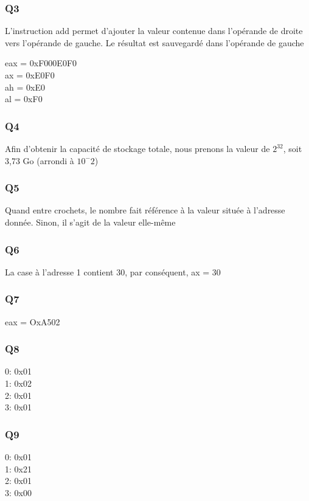 \documentclass[12pt,a4paper,oneside]{article}
\begin{document}
\subsubsection{Q3}
L'instruction add permet d'ajouter la valeur contenue dans l'opérande de droite vers l'opérande de gauche. Le résultat est sauvegardé dans l'opérande de gauche

eax = 0xF000E0F0\\
ax = 0xE0F0\\
ah = 0xE0\\
al = 0xF0\\

\subsubsection{Q4}
Afin d'obtenir la capacité de stockage totale, nous prenons la valeur de $2^{32}$, soit 3,73 Go (arrondi à $10^-2$)

\subsubsection{Q5}
Quand entre crochets, le nombre fait référence à la valeur située à l'adresse donnée. Sinon, il s'agit de la valeur elle-même

\subsubsection{Q6}
La case à l'adresse 1 contient 30, par conséquent, ax = 30

\subsubsection{Q7}
eax = OxA502

\subsubsection{Q8}
0: 0x01\\
1: 0x02\\
2: 0x01\\
3: 0x01\\

\subsubsection{Q9}
0: 0x01\\
1: 0x21\\
2: 0x01\\
3: 0x00\\
\end{document}
